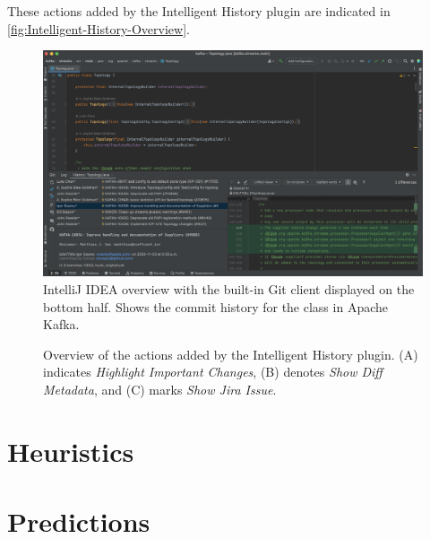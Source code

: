 These actions added by the Intelligent History plugin are indicated in \autoref{fig:Intelligent-History-Overview}.

\begin{figure}
    \includegraphics[width=\textwidth]{./images/intellij-overview.png}
    \caption{
        IntelliJ IDEA overview with the built-in Git client displayed on the bottom half. Shows the commit history for the  class in Apache Kafka.
    }
    \label{fig:IntelliJ-Overview}
\end{figure}

\begin{figure}
    \caption{Overview of the actions added by the Intelligent History plugin. (A) indicates \textit{Highlight Important Changes}, (B) denotes \textit{Show Diff Metadata}, and (C) marks \textit{Show Jira Issue}.}
    \label{fig:Intelligent-History-Overview}
\end{figure}

\section{Heuristics}
\label{sec:Heuristics}

\section{Predictions}
\label{sec:Predictions}

\endinput

Any text after an \endinput is ignored.
You could put scraps here or things in progress.